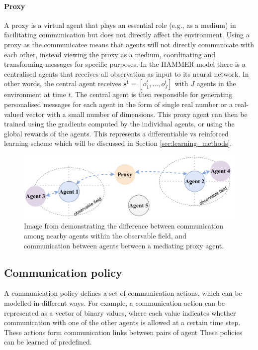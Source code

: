 \documentclass{article}
\begin{document}
\paragraph{Proxy} A proxy is a virtual agent that plays an essential role (e.g., as a medium) in facilitating communication but does not directly affect the environment. Using a proxy as the communicatee means that agents will not directly communicate with each other, instead viewing the proxy as a medium, coordinating and transforming messages for specific purposes. In the HAMMER model \citep{gupta2022HAMMER} there is a centralised agents that receives all observation as input to its neural network. In other words, the central agent receives $\mathbf{s^t} = [o^t_1, \hdots, o_J^t]$ with $J$ agents in the environment at time $t$. The central agent is then responsible for generating personalised messages for each agent in the form of single real number or a real-valued vector with a small number of dimensions. This proxy agent can then be trained using the gradients computed by the individual agents, or using the global rewards of the agents. This represents a differentiable vs reinforced learning scheme which will be discussed in Section \ref{sec:learning_methods}. 

\begin{figure}
	\centering
	\includegraphics[scale=0.5]{images/communicatee.png}
	\caption{Image from \citet{zhu2024survey} demonstrating the difference between communication among nearby agents within the observable field, and communication between agents between a mediating proxy agent.}
	\label{fig:communicatee}
\end{figure}

\subsection{Communication policy}


A communication policy defines a set of communication actions, which can be modelled in different ways. For example, a communication action can be represented as a vector of binary values, where each value indicates whether communication with one of the other agents is allowed at a certain time step. These actions form communication links between pairs of agent These policies can be learned of predefined. 
\end{document}
